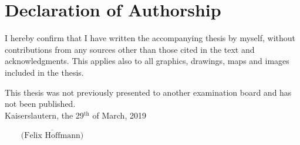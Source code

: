 \section*{Declaration of Authorship}

I hereby confirm that I have written the accompanying thesis by myself, without contributions from any sources other than those cited in the text and acknowledgments. This applies also to all graphics, drawings, maps and images included in the thesis.

This thesis was not previously presented to another examination board and has not been published.\\[2ex] 

\noindent Kaiserslautern, the 29$^{\text{th}}$ of March, 2019
\begin{flushright}
	$\overline{~~~~~~~~~\mbox{(Felix Hoffmann)}~~~~~~~~~}$
\end{flushright}
